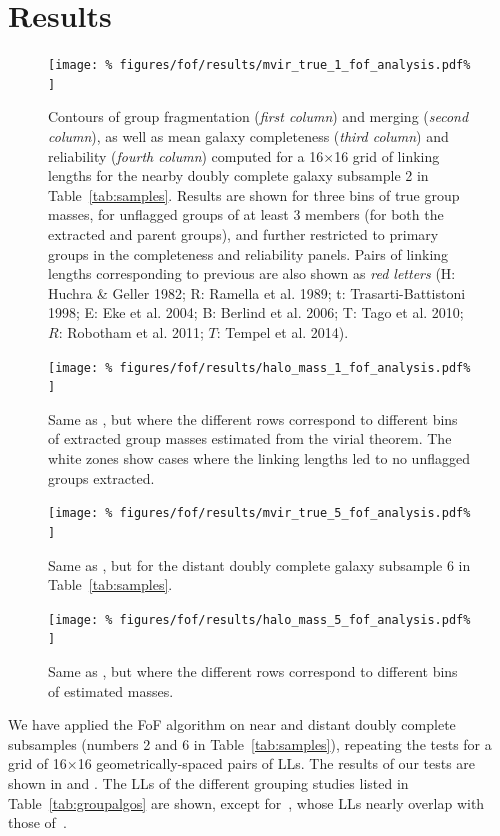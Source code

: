 \section{Results}
\label{sec:results}
%
\begin{figure}
    \centering
    \texttt{[image: \%
        figures/fof/results/mvir\_true\_1\_fof\_analysis.pdf\%
    ]}
    \caption{Contours of group fragmentation (\emph{first column}) and merging
        (\emph{second column}), as well as mean galaxy completeness
        (\emph{third column}) and reliability (\emph{fourth column}) computed
        for a 16$\times$16 grid of linking lengths for the nearby doubly
        complete galaxy subsample 2 in Table~\ref{tab:samples}. Results are
        shown for three bins of true group masses, for  unflagged groups of at
        least 3 members (for both the extracted and parent groups), and further
        restricted to primary groups in the completeness and reliability
        panels. Pairs of linking lengths corresponding to previous are also
        shown as \emph{red letters}
        (H\@: Huchra \& Geller 1982;
        R\@: Ramella et al. 1989;
        t:        Trasarti-Battistoni 1998;
        E\@: Eke et al. 2004;
        B\@: Berlind et al. 2006;
        T\@: Tago et al. 2010;
        $R$: Robotham et al. 2011;
        $T$: Tempel et al. 2014). }
\label{fig:test_true_small}
\end{figure}
%
\begin{figure}
    \centering
    \texttt{[image: \%
        figures/fof/results/halo\_mass\_1\_fof\_analysis.pdf\%
    ]}
    \caption{Same as , but
      where the different rows correspond to different bins of extracted group
  masses estimated from the virial theorem. The white zones show cases where
  the linking lengths led to no unflagged groups extracted. }
\label{fig:test_estimated_small}
\end{figure}
%
\begin{figure}
    \centering
    \texttt{[image: \%
        figures/fof/results/mvir\_true\_5\_fof\_analysis.pdf\%
    ]}
    \caption{Same as , but for the distant
    doubly complete galaxy subsample 6 in
Table~\ref{tab:samples}.\label{fig:test_true_big}}
\end{figure}
%
\begin{figure}
    \centering
    \texttt{[image: \%
        figures/fof/results/halo\_mass\_5\_fof\_analysis.pdf\%
    ]}
    \caption{Same as , but where the different
    rows correspond to different bins of estimated
masses.\label{fig:test_estimated_big}}
%
\end{figure}
%
We have applied the FoF algorithm on near and distant doubly complete
subsamples (numbers 2 and 6 in Table~\ref{tab:samples}), repeating the tests
for a grid of 16$\times$16 geometrically-spaced pairs of LLs. The results of
our tests are shown in  and
. The LLs of the different grouping studies listed
in Table~\ref{tab:groupalgos} are shown, except for~\cite{MZ02}, whose LLs
nearly overlap with those of~\cite{Eke+04}.

